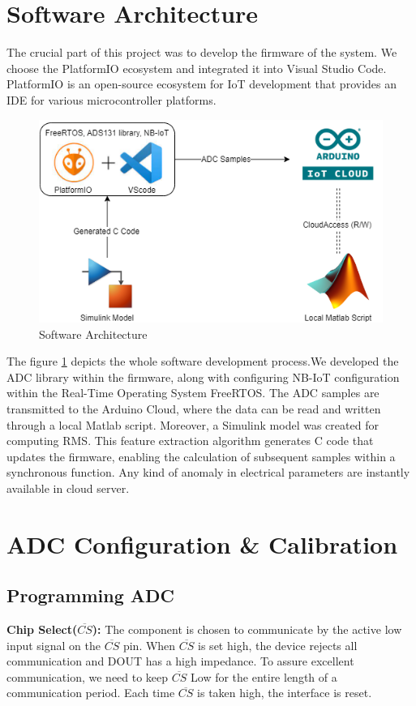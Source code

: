 \section{Software Architecture} 
The crucial part of this project was to develop the firmware of the system. We choose the PlatformIO ecosystem and integrated it into Visual Studio Code. PlatformIO is an open-source ecosystem for IoT development that provides an IDE for various microcontroller platforms. 
\begin{figure}[htbp]
\centering
\includegraphics[scale=0.5]{images/Software Architecture.png}
\caption{Software Architecture}
\label{fig:x Software Architecture}
\end{figure}
The figure \ref{fig:x Software Architecture} depicts the whole software development process.We developed the ADC library within the firmware, along with configuring NB-IoT configuration within the Real-Time Operating System FreeRTOS. The ADC samples are transmitted to the Arduino Cloud, where the data can be read and written through a local Matlab script. Moreover, a Simulink model was created for computing RMS. This feature extraction algorithm generates C code that updates the firmware, enabling the calculation of subsequent samples within a synchronous function. Any kind of anomaly in electrical parameters are instantly available in cloud server.
\section{ADC Configuration \& Calibration} 
\subsection{Programming ADC} 
\textbf{Chip Select($\overline{CS}$):} The component is chosen to communicate by the active low input signal on the $\overline{CS}$ pin. When $\overline{CS}$ is set high, the device rejects all communication and DOUT has a high impedance. To assure excellent communication, we need to keep $\overline{CS}$ Low for the entire length of a communication period. Each time $\overline{CS}$ is taken high, the interface is reset. \par

